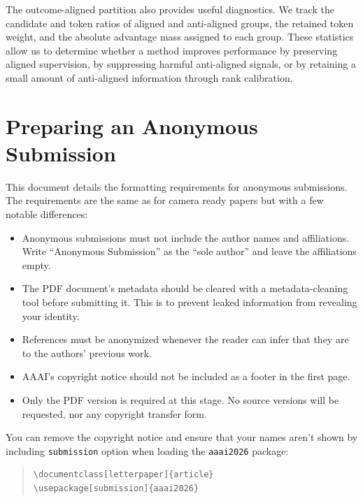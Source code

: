 \documentclass[letterpaper]{article} %
\begin{document}
The outcome-aligned partition also provides useful diagnostics. We track the candidate and token ratios of aligned and anti-aligned groups, the retained token weight, and the absolute advantage mass assigned to each group. These statistics allow us to determine whether a method improves performance by preserving aligned supervision, by suppressing harmful anti-aligned signals, or by retaining a small amount of anti-aligned information through rank calibration.

\iffalse
\section{Preparing an Anonymous Submission}

This document details the formatting requirements for anonymous submissions. The requirements are the same as for camera ready papers but with a few notable differences:

\begin{itemize}
    \item Anonymous submissions must not include the author names and affiliations. Write ``Anonymous Submission'' as the ``sole author'' and leave the affiliations empty.
    \item The PDF document's metadata should be cleared with a metadata-cleaning tool before submitting it. This is to prevent leaked information from revealing your identity.
    \item References must be anonymized whenever the reader can infer that they are to the authors' previous work.
    \item AAAI's copyright notice should not be included as a footer in the first page.
    \item Only the PDF version is required at this stage. No source versions will be requested, nor any copyright transfer form.
\end{itemize}

You can remove the copyright notice and ensure that your names aren't shown by including \texttt{submission} option when loading the \texttt{aaai2026} package:

\begin{quote}\begin{scriptsize}\begin{verbatim}
\documentclass[letterpaper]{article}
\usepackage[submission]{aaai2026}
\end{verbatim}\end{scriptsize}\end{quote}
\end{document}
